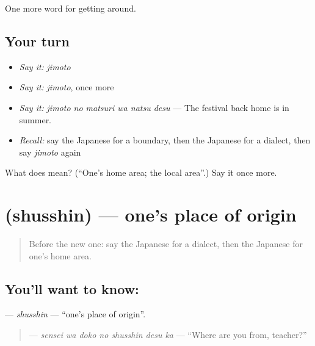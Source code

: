 \begin{grammarlens}[title={What you've built}]
One more word for getting around.
\end{grammarlens}

\subsection*{Your turn}
\begin{itemize}
\raggedright
  \item \emph{Say it:} \emph{jimoto}
  \item \emph{Say it:} \emph{jimoto}, once more
  \item \emph{Say it:} \emph{jimoto no matsuri wa natsu desu} — The festival back home is in summer.
  \item \emph{Recall:} say the Japanese for a boundary, then the Japanese for a dialect, then say \emph{jimoto} again
\end{itemize}

\begin{tcolorbox}[breakable,colback=teal!4,colframe=teal!35!black,title={Before you move on}]
What does  mean? (\textquotedblleft{}One's home area; the local area\textquotedblright{}.) Say it once more.
\end{tcolorbox}
\section[\texorpdfstring{\ja{しゅっしん} (shusshin)}{しゅっしん (shusshin)}]{ (shusshin) — one's place of origin}

\label{lesson:JA-C410-shusshin}



\begin{quote}
Before the new one: say the Japanese for a dialect, then the Japanese for one's home area.
\end{quote}

\subsection*{You'll want to know: }
\textbf{} — \emph{shusshin} — \textquotedblleft{}one's place of origin\textquotedblright{}.

\begin{quote}
\textbf{  } — \emph{sensei wa doko no shusshin desu ka} — \textquotedblleft{}Where are you from, teacher?\textquotedblright{}
\end{quote}

